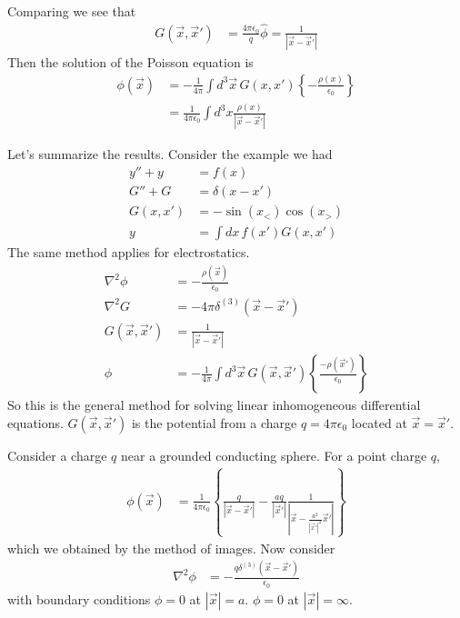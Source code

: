 Comparing we see that
\begin{align}
    G\left( \vec{x}, \vec{x}' \right)
    &=
    \frac{4\pi\epsilon_0}{q}\hat{\phi}
    =
    \frac{1}{\left|\vec{x} - \vec{x}'\right|}
\end{align}
Then the solution of the Poisson equation is
\begin{align}
    \phi\left( \vec{x} \right)
    &=
    -\frac{1}{4\pi}
    \int d^3\vec{x}\,
    G\left( x, x' \right)
    \left\{ 
    -\frac{\rho(x)}{\epsilon_0}
    \right\}\\
    &=
    \frac{1}{4\pi\epsilon_0}
    \int d^3x
    \frac{\rho(x)}{\left|\vec{x} - \vec{x}'\right|}
\end{align}

Let's summarize the results.
Consider the example we had
\begin{align}
    y'' + y &= f(x)\\
    G'' + G &= \delta\left( x - x' \right)\\
    G\left( x, x' \right) &= -\sin\left( x_{<} \right)\cos\left( x_{>}
    \right)\\
    y &= \int dx\, f\left( x' \right) G\left( x, x' \right)
\end{align}
The same method applies for electrostatics.
\begin{align}
    \nabla^2 \phi &=
    -\frac{\rho\left( \vec{x} \right)}{\epsilon_0}\\
    \nabla^2 G &=
    -4\pi \delta^{(3)}\left( \vec{x} - \vec{x}' \right)\\
    G\left( \vec{x}, \vec{x}' \right)
    &=
    \frac{1}{\left|\vec{x} - \vec{x}'\right|}\\
    \phi &=
    -\frac{1}{4\pi}\int d^3\vec{x}\,
    G\left( \vec{x}, \vec{x}' \right)
    \left\{ 
    \frac{-\rho\left( \vec{x}' \right)}{\epsilon_0}
    \right\}
\end{align}
So this is the general method for solving linear inhomogeneous differential
equations.
$G\left( \vec{x}, \vec{x}' \right)$
is the potential from a charge $q=4\pi\epsilon_0$
located at $\vec{x}=\vec{x}'$.

Consider a charge $q$ near a grounded conducting sphere.
For a point charge $q$,
\begin{align}
    \phi(\vec{x})
    &=
    \frac{1}{4\pi\epsilon_0}
    \left\{ 
    \frac{q}{\left|\vec{x} - \vec{x}'\right|}
    -
    \frac{aq}{\left|\vec{x}'\right|}
    \frac{1}{\left|\vec{x} - \frac{a^2}{\left|\vec{x}'\right|^2}\vec{x}'\right|}
    \right\}
\end{align}
which we obtained by the method of images.
Now consider 
\begin{align}
    \nabla^2 \phi
    &=
    -\frac{q\delta^{(3)}\left( \vec{x} - \vec{x}' \right)}{\epsilon_0}
\end{align}
with boundary conditions
$\phi=0$ at $\left|\vec{x}\right|=a$.
$\phi=0$ at $\left|\vec{x}\right|=\infty$.

